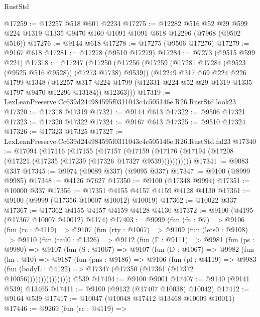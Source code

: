 \begin{lexlean}{RustStd}
\begin{coremodule}
@17259 := @12257 @518 @601 @2234
@17275 := @12282
    @516
    @52
    @29
    @599
    @224
    @1319
    @1335
    @9470
    @160
    @1091
    @1091
    @618
    @12296
    (@7968 (@9502 @516))
@17276 := @9144 @618
@17278 := @17275 (@9506 @17276)
@17279 := @9167 @618
@17281 := @17278 (@9510 @17279)
@17284 := @7273 (@9515 @599 @224)
@17318 := @17247
    (@17250
      (@17256
        (@17259 (@17281 @17284 (@9523 (@9525 @516 @9528)) (@7273 @7738) @9539))
        (@12249
          @317
          @69
          @224
          @226
          @1799
          @1348
          (@12257 @317 @224 @1799 (@12331 @224 @52 @29 @1319 @1335 @1797 @9470 @12296 @13184))
          @12363)))
@17319 := LexLeanPreserve.Cc639d244984595f0311043c4c505146e.R26.RustStd.look23
@17320 := @17318 @17319
@17321 := @9144 @613
@17322 := @9506 @17321
@17323 := @17320 @17322
@17324 := @9167 @613
@17325 := @9510 @17324
@17326 := @17323 @17325
@17327 := LexLeanPreserve.Cc639d244984595f0311043c4c505146e.R26.RustStd.fal23
@17340 := @17094
    (@17116
      (@17155
        (@17157
          (@17159 (@17176 (@17194 (@17208 (@17221 (@17235 (@17239 (@17326 @17327 @9539)))))))))))
@17341 := @9083 @337
@17345 := @9974 (@9089 @337) (@9095 @337)
@17347 := @9100 (@8999 @9985)
@17348 := @4126 @7627
@17350 := @9100 (@17348 @9994)
@17351 := @10000 @337
@17356 := @17351 @4155 @4157 @4159 @4128 @4130
@17361 := @9100 (@9999 (@17356 @10007 @10012) @10019)
@17362 := @10022 @337
@17367 := @17362 @4155 @4157 @4159 @4128 @4130
@17372 := @9100 (@4195 (@17367 @10007 @10012) @1174)
@17403 := @9099
    (fun (fn : @7) =>
    @9106
      (fun (rc : @4119) =>
      @9107
        (fun (rty : @1067) =>
        @9109
          (fun (lets0 : @9108) =>
          @9110
            (fun (tail0 : @1326) =>
            @9112
              (fun (Γ : @9111) =>
              @9981
                (fun (ps : @9980) =>
                @9107
                  (fun (S : @1067) =>
                  @9107
                    (fun (D : @1067) =>
                    @9982
                      (fun (hn : @10) =>
                      @9187
                        (fun (pns : @9186) =>
                        @9106
                          (fun (pl : @4119) =>
                          @9983
                            (fun (bodyL : @4122) =>
                            @17347 (@17350 (@17361 (@17372 @10056))))))))))))))))
    @539
@17404 := @9100 @9001
@17407 := @9140 (@9141 @539) @13465
@17411 := @9100 (@9132 (@17407 @10038) @10042)
@17412 := @9164 @539
@17417 := @10047 (@10048 @17412 @13468 @10009 @10011)
@17446 := @9269
    (fun (rc : @4119) =>

\end{coremodule}
\end{lexlean}
